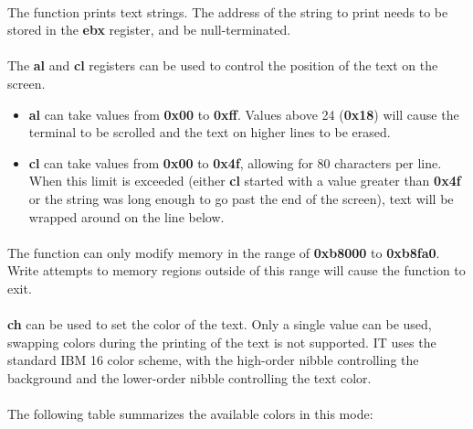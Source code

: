 \documentclass[12pt,letterpaper]{article}
\begin{document}
\paragraph{}
The function prints text strings. The address of the string to print needs to be stored in the \textbf{ebx}
 register, and be null-terminated.

\paragraph{}
The \textbf{al} and \textbf{cl} registers can be used to control the position of the text on the screen.
\begin{itemize}
    \item \textbf{al} can take values from \textbf{0x00} to \textbf{0xff}. Values above 24 (\textbf{0x18}) will cause the terminal to be scrolled and the text on higher lines to be erased.
    \item \textbf{cl} can take values from \textbf{0x00} to \textbf{0x4f}, allowing for 80 characters per line. When this limit is exceeded (either \textbf{cl} started with a value greater than \textbf{0x4f} or the string was long enough to go past the end of the screen), text will be wrapped around on the line below.
\end{itemize}

\paragraph{}
The function can only modify memory in the range of \textbf{0xb8000} to \textbf{0xb8fa0}. Write attempts to memory regions outside of this range will cause the function to exit.

\paragraph{}
\textbf{ch} can be used to set the color of the text. Only a single value can be used, swapping colors during the printing of the text is not supported. IT uses the standard IBM 16 color scheme, with the high-order nibble controlling the background and the lower-order nibble controlling the text color.

\newpage
\paragraph{}
The following table summarizes the available colors in this mode:
\end{document}
